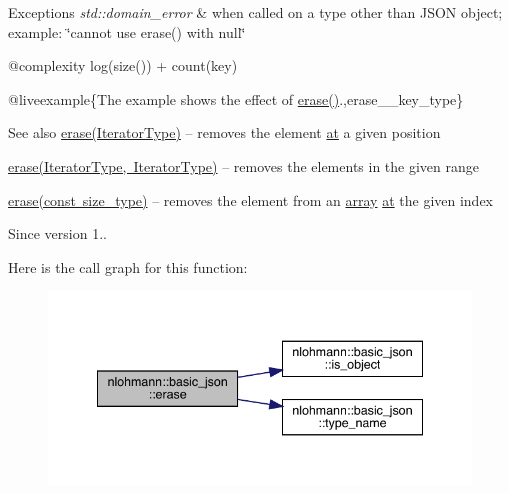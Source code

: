 \begin{DoxyExceptions}{Exceptions}
{\em std\+::domain\+\_\+error} & when called on a type other than J\+S\+ON object; example\+: {\ttfamily \char`\"{}cannot use erase() with null\char`\"{}}\\
\hline
\end{DoxyExceptions}
@complexity {\ttfamily log(size()) + count(key)}

@liveexample\{The example shows the effect of {\ttfamily \mbox{\hyperlink{classnlohmann_1_1basic__json_a068a16e76be178e83da6a192916923ed}{erase()}}}.,erase\+\_\+\+\_\+key\+\_\+type\}

\begin{DoxySeeAlso}{See also}
\mbox{\hyperlink{classnlohmann_1_1basic__json_a068a16e76be178e83da6a192916923ed}{erase(\+Iterator\+Type)}} -- removes the element \mbox{\hyperlink{classnlohmann_1_1basic__json_a73ae333487310e3302135189ce8ff5d8}{at}} a given position 

\mbox{\hyperlink{classnlohmann_1_1basic__json_a4b3f7eb2d4625d95a51fbbdceb7c5f39}{erase(\+Iterator\+Type, Iterator\+Type)}} -- removes the elements in the given range 

\mbox{\hyperlink{classnlohmann_1_1basic__json_a88cbcefe9a3f4d294bed0653550a5cb9}{erase(const size\+\_\+type)}} -- removes the element from an \mbox{\hyperlink{classnlohmann_1_1basic__json_a4a4ec75e4d2845d9bcf7a9e5458e4949}{array}} \mbox{\hyperlink{classnlohmann_1_1basic__json_a73ae333487310e3302135189ce8ff5d8}{at}} the given index
\end{DoxySeeAlso}
\begin{DoxySince}{Since}
version 1.. 
\end{DoxySince}
Here is the call graph for this function\+:
\nopagebreak
\begin{figure}[H]
\begin{center}
\leavevmode
\includegraphics[width=341pt]{classnlohmann_1_1basic__json_a2f8484d69c55d8f2a9697a7bec29362a_cgraph}
\end{center}
\end{figure}
